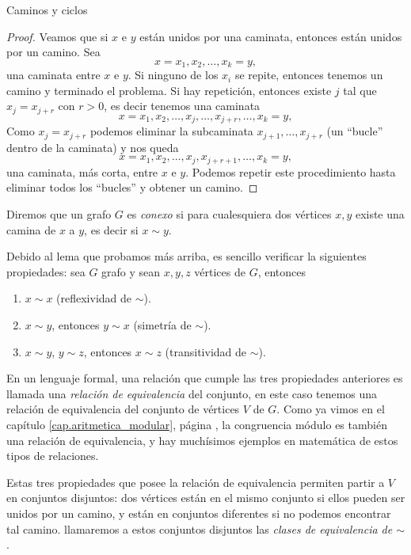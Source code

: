\begin{section}{Caminos y ciclos}
\begin{proof}
Veamos que si  $x$ e $y$ están unidos por una caminata, entonces están unidos por un camino. Sea 
$$
x=x_1,x_2,\ldots,x_k=y,
$$
una caminata entre  $x$ e $y$. Si ninguno de los $x_i$ se repite, entonces tenemos un camino y terminado el problema. Si hay repetición, entonces existe $j$ tal que $x_j = x_{j+r}$ con $r >0$, es decir tenemos una caminata
$$
x=x_1,x_2,\ldots,x_j,\ldots,x_{j+r},\ldots, x_k=y,
$$
Como $x_j = x_{j+r}$ podemos eliminar la subcaminata $x_{j+1},\ldots,x_{j+r}$ (un ``bucle'' dentro de la caminata) y nos queda 
$$
x=x_1,x_2,\ldots,x_j,x_{j+r+1},\ldots, x_k=y,
$$
una caminata, más corta,  entre $x$ e $y$. Podemos repetir este procedimiento hasta eliminar todos los ``bucles'' y obtener un camino.
\end{proof}

\begin{definicion} Diremos que un grafo  $G$ es \textit{conexo} si para cualesquiera dos vértices $x,y$ existe una camina de $x$ a $y$, es decir si  $x \sim y$. 
\end{definicion}

Debido al lema que probamos más arriba, es sencillo verificar la siguientes propiedades: sea $G$ grafo y sean $x,y,z$ vértices de $G$, entonces
\begin{enumerate}[label=\textit{\alph*)}]
\item  $x \sim x$ (reflexividad de $\sim$).
\item  $x \sim y$, entonces $y \sim x$ (simetría de $\sim$).
\item  $x \sim y$,  $y \sim z$, entonces  $x \sim z$ (transitividad  de $\sim$).
\end{enumerate}


En un lenguaje formal, una relación que  cumple las tres propiedades anteriores es llamada una  \textit{relación de equivalencia} del conjunto, en este caso tenemos una relación de equivalencia del conjunto de vértices $V$ de $G$. Como ya vimos en el capítulo \ref{cap.aritmetica_modular}, página  \pageref{relacion-de-equivalencia}, la congruencia módulo es también una relación de equivalencia, y hay muchísimos ejemplos en matemática de estos tipos de relaciones. 

Estas tres propiedades que posee la relación de equivalencia permiten partir a $V$ en conjuntos disjuntos: dos vértices están en el mismo conjunto si ellos pueden ser unidos por un camino, y están en conjuntos diferentes si no podemos encontrar tal camino. llamaremos a estos conjuntos disjuntos las \textit{clases de equivalencia de $\sim$}.


\end{section}
